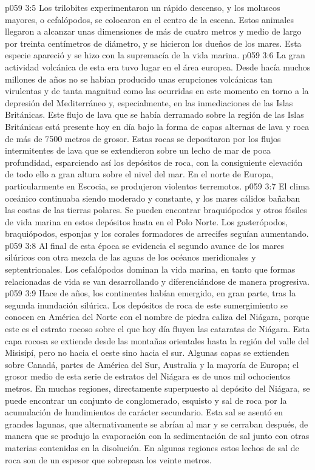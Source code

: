 \vs p059 3:5 Los trilobites experimentaron un rápido descenso, y los moluscos mayores, o cefalópodos, se colocaron en el centro de la escena. Estos animales llegaron a alcanzar unas dimensiones de más de cuatro metros y medio de largo por treinta centímetros de diámetro, y se hicieron los dueños de los mares. Esta especie apareció  y se hizo con la supremacía de la vida marina.
\vs p059 3:6 La gran actividad volcánica de esta era tuvo lugar en el área europea. Desde hacía muchos millones de años no se habían producido unas erupciones volcánicas tan virulentas y de tanta magnitud como las ocurridas en este momento en torno a la depresión del Mediterráneo y, especialmente, en las inmediaciones de las Islas Británicas. Este flujo de lava que se había derramado sobre la región de las Islas Británicas está presente hoy en día bajo la forma de capas alternas de lava y roca de más de 7500 metros de grosor. Estas rocas se depositaron por los flujos intermitentes de lava que se extendieron sobre un lecho de mar de poca profundidad, esparciendo así los depósitos de roca, con la consiguiente elevación de todo ello a gran altura sobre el nivel del mar. En el norte de Europa, particularmente en Escocia, se produjeron violentos terremotos.
\vs p059 3:7 El clima oceánico continuaba siendo moderado y constante, y los mares cálidos bañaban las costas de las tierras polares. Se pueden encontrar braquiópodos y otros fósiles de vida marina en estos depósitos hasta en el Polo Norte. Los gasterópodos, braquiópodos, esponjas y los corales formadores de arrecifes seguían aumentando.
\vs p059 3:8 Al final de esta época se evidencia el segundo avance de los mares silúricos con otra mezcla de las aguas de los océanos meridionales y septentrionales. Los cefalópodos dominan la vida marina, en tanto que formas relacionadas de vida se van desarrollando y diferenciándose de manera progresiva.
\vs p059 3:9 \pc Hace  de años, los continentes habían emergido, en gran parte, tras la segunda inundación silúrica. Los depósitos de roca de este sumergimiento se conocen en América del Norte con el nombre de piedra caliza del Niágara, porque este es el estrato rocoso sobre el que hoy día fluyen las cataratas de Niágara. Esta capa rocosa se extiende desde las montañas orientales hasta la región del valle del Misisipí, pero no hacia el oeste sino hacia el sur. Algunas capas se extienden sobre Canadá, partes de América del Sur, Australia y la mayoría de Europa; el grosor medio de esta serie de estratos del Niágara es de unos mil ochocientos metros. En muchas regiones, directamente superpuesto al depósito del Niágara, se puede encontrar un conjunto de conglomerado, esquisto y sal de roca por la acumulación de hundimientos de carácter secundario. Esta sal se asentó en grandes lagunas, que alternativamente se abrían al mar y se cerraban después, de manera que se produjo la evaporación con la sedimentación de sal junto con otras materias contenidas en la disolución. En algunas regiones estos lechos de sal de roca son de un espesor que sobrepasa los veinte metros.
